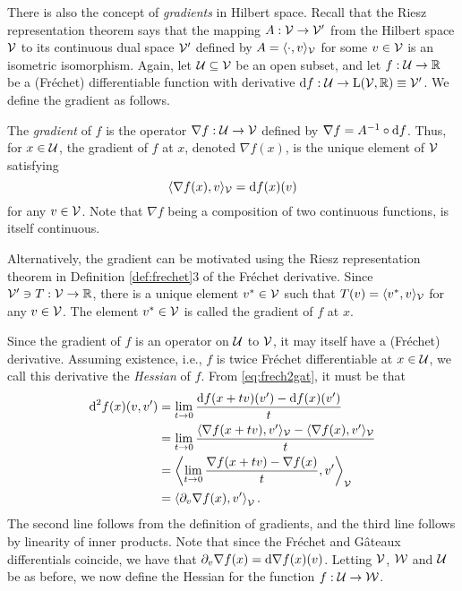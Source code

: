 There is also the concept of \emph{gradients} in Hilbert space.
Recall that the Riesz representation theorem says that the mapping $A:{\mathcal V}\to{\mathcal V}'$ from the Hilbert space ${\mathcal V}$ to its continuous dual space ${\mathcal V}'$ defined by $A = \langle\cdot,v\rangle_{\mathcal V}$ for some $v\in{\mathcal V}$ is an isometric isomorphism.
Again, let ${\mathcal U} \subseteq {\mathcal V}$ be an open subset, and let $f:{\mathcal U}\to\mathbb{R}$ be a (Fréchet) differentiable function with derivative $\text{d} f: {\mathcal U} \to \text{L}({\mathcal V},\mathbb{R}) \equiv {\mathcal V}'$.
We define the gradient as follows.

\begin{definition}
  The \emph{gradient} of $f$ is the operator $\nabla f: {\mathcal U} \to {\mathcal V}$ defined by $\nabla f = A^{-1} \circ \text{d} f$.
  Thus, for $x \in {\mathcal U}$, the gradient of $f$ at $x$, denoted $\nabla f(x)$, is the unique element of ${\mathcal V}$ satisfying
  \[
    \langle\nabla f(x), v\rangle_{\mathcal V} = \text{d} f(x)(v)
  \]
  for any $v \in {\mathcal V}$.
  Note that $\nabla f$ being a composition of two continuous functions, is itself continuous.
\end{definition}

\begin{remark}
  Alternatively, the gradient can be motivated using the Riesz representation theorem in Definition \ref{def:frechet}3 of the Fréchet derivative.
  Since ${\mathcal V}'\ni T:{\mathcal V}\to\mathbb{R}$, there is a unique element $v^*\in{\mathcal V}$ such that $T(v)=\langle v^*,v\rangle_{\mathcal V}$ for any $v\in{\mathcal V}$.
  The element $v^*\in{\mathcal V}$ is called the gradient of $f$ at $x$.
\end{remark}

Since the gradient of $f$ is an operator on ${\mathcal U}$ to ${\mathcal V}$, it may itself have a (Fréchet) derivative.
Assuming existence, i.e., $f$ is twice Fréchet differentiable at $x \in {\mathcal U}$, we call this derivative the \emph{Hessian} of $f$.
From \eqref{eq:frech2gat}, it must be that
\begin{align*}
  \d^2 f(x)(v,v') &= \lim_{t\to 0} \frac{\d f(x + t v)(v') - \d f(x)(v')}{t} \\
  &= \lim_{t\to 0} \frac{\ip{\nabla f(x+tv), v'}_\cV - \ip{\nabla f(x), v'}_\cV}{t} \\
  &= \left\langle \lim_{t\to 0} \frac{\nabla f(x+tv) - \nabla f(x)}{t} , v' \right\rangle_\cV \\%
  &= \left\langle \partial_v \nabla f(x) , v' \right\rangle_\cV.
\end{align*}
The second line follows from the definition of gradients, and the third line follows by linearity of inner products.
Note that since the Fréchet and Gâteaux differentials coincide, we have that $\partial_v \nabla f(x) = \text{d} \nabla f(x) (v)$.
Letting ${\mathcal V}$, ${\mathcal W}$ and ${\mathcal U}$ be as before, we now define the Hessian for the function $f:{\mathcal U} \to {\mathcal W}$.

